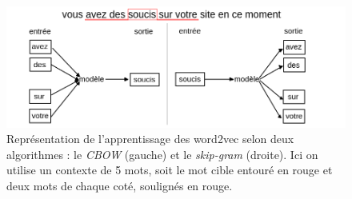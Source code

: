 \begin{figure}[thb]
  \centering
    \includegraphics[width=14cm]{./Chapitre6/figures/cbow_skip.png}
    \caption{Représentation de l'apprentissage des word2vec selon deux algorithmes : le \textit{CBOW} (gauche) et le \textit{skip-gram} (droite). Ici on utilise un contexte de 5 mots, soit le mot cible entouré en rouge et deux mots de chaque coté, soulignés en rouge.
 }
    \label{fig:cbow_skip}
\end{figure}
